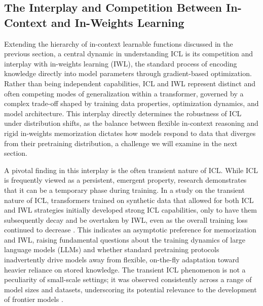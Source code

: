 \documentclass[11pt]{article}
\begin{document}
\subsection{The Interplay and Competition Between In-Context and In-Weights Learning}

Extending the hierarchy of in-context learnable functions discussed in the previous section, a central dynamic in understanding ICL is its competition and interplay with in-weights learning (IWL), the standard process of encoding knowledge directly into model parameters through gradient-based optimization. Rather than being independent capabilities, ICL and IWL represent distinct and often competing modes of generalization within a transformer, governed by a complex trade-off shaped by training data properties, optimization dynamics, and model architecture. This interplay directly determines the robustness of ICL under distribution shifts, as the balance between flexible in-context reasoning and rigid in-weights memorization dictates how models respond to data that diverges from their pretraining distribution, a challenge we will examine in the next section.

A pivotal finding in this interplay is the often transient nature of ICL. While ICL is frequently viewed as a persistent, emergent property, research demonstrates that it can be a temporary phase during training. In a study on the transient nature of ICL, transformers trained on synthetic data that allowed for both ICL and IWL strategies initially developed strong ICL capabilities, only to have them subsequently decay and be overtaken by IWL, even as the overall training loss continued to decrease \cite{ref73}. This indicates an asymptotic preference for memorization and IWL, raising fundamental questions about the training dynamics of large language models (LLMs) and whether standard pretraining protocols inadvertently drive models away from flexible, on-the-fly adaptation toward heavier reliance on stored knowledge. The transient ICL phenomenon is not a peculiarity of small-scale settings; it was observed consistently across a range of model sizes and datasets, underscoring its potential relevance to the development of frontier models \cite{ref73}.
\end{document}
